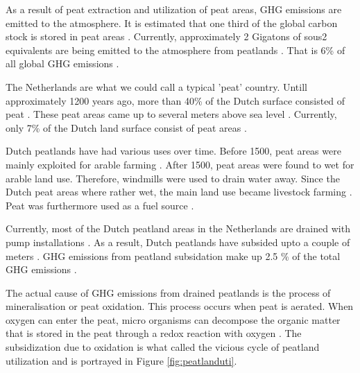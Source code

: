 \documentclass[a4paper,12pt]{scrbook}
\begin{document}

As a result of peat extraction and utilization of peat areas, \ac{GHG} emissions are emitted to the atmosphere. It is estimated that one third of the global carbon stock is stored in peat areas \citep{page2011global}. Currently, approximately 2 Gigatons of sous{2} equivalents are being emitted to the atmosphere from peatlands \citep{joosten2009global}. That is 6\% of all global \ac{GHG} emissions \citep{joosten2012peatlands}.



The Netherlands are what we could call a typical 'peat' country. Untill approximately 1200 years ago, more than 40\% of the Dutch surface consisted of peat \citep{vos2015origin, de2008vergeten}. These peat areas came up to several meters above sea level \citep{de2008vergeten}. Currently, only 7\% of the Dutch land surface consist of peat areas \citep{de2004verbreiding}. 

Dutch peatlands have had various uses over time. Before 1500, peat areas were mainly exploited for arable farming \citep{ettema2005boeren}. After 1500, peat areas were found to wet for arable land use. Therefore, windmills were used to drain water away. Since the Dutch peat areas where rather wet, the main land use became livestock farming \citep{brouns2016effects}. Peat was furthermore used as a fuel source \citep{van1996turfwinning}.


Currently, most of the Dutch peatland areas in the Netherlands are drained with pump installations \citep{brouns2016effects}. As a result, Dutch peatlands have subsided upto a couple of meters \citep{de2008vergeten}. \ac{GHG} emissions from peatland subsidation make up 2.5 \% of the total GHG emissions \citep{van2010emission}. 

The actual cause of \ac{GHG} emissions from drained peatlands is the process of mineralisation or peat oxidation. This process occurs when peat is aerated. When oxygen can enter the peat, micro organisms can decompose the organic matter that is stored in the peat through a redox reaction with oxygen \citep{erkens2016double}. The subsidization due to oxidation is what \citet{kuntze1984bewirtschaftung} called the vicious cycle of peatland utilization and is portrayed in Figure \ref{fig:peatlanduti}.
\end{document}
